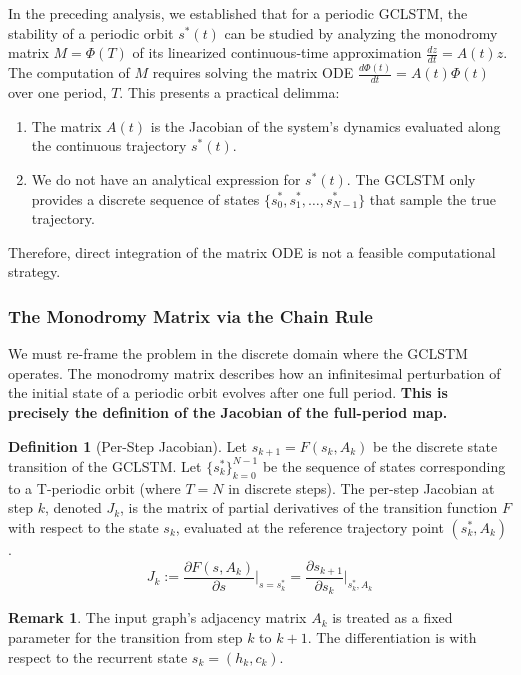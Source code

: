\documentclass{article}
\theoremstyle{remark}
\theoremstyle{definition}
\newtheorem{definition}{Definition}
\newtheorem{remark}[theorem]{Remark}
\newcommand{\dpt}[1]{\frac{d#1}{dt}} %
\begin{document}
In the preceding analysis, we established that for a periodic GCLSTM, the stability of a periodic orbit $s^*(t)$ can be studied by analyzing the monodromy matrix $M = \Phi(T)$ of its linearized continuous-time approximation $\dpt{z} = A(t)z$. The computation of $M$ requires solving the matrix ODE $\dpt{\Phi(t)} = A(t)\Phi(t)$ over one period, $T$. This presents a practical delimma:
\begin{enumerate}
    \item The matrix $A(t)$ is the Jacobian of the system's dynamics evaluated along the continuous trajectory $s^*(t)$.
    \item We do not have an analytical expression for $s^*(t)$. The GCLSTM only provides a discrete sequence of states $\{s^*_0, s^*_1, \dots, s^*_{N-1}\}$ that sample the true trajectory.
\end{enumerate}
Therefore, direct integration of the matrix ODE is not a feasible computational strategy.

\subsubsection{The Monodromy Matrix via the Chain Rule}

We must re-frame the problem in the discrete domain where the GCLSTM operates. The monodromy matrix describes how an infinitesimal perturbation of the initial state of a periodic orbit evolves after one full period. \textbf{This is precisely the definition of the Jacobian of the full-period map.}

\begin{definition}[Per-Step Jacobian]
Let $s_{k+1} = F(s_k, A_k)$ be the discrete state transition of the GCLSTM. Let $\{s^*_k\}_{k=0}^{N-1}$ be the sequence of states corresponding to a T-periodic orbit (where $T=N$ in discrete steps). The per-step Jacobian at step $k$, denoted $J_k$, is the matrix of partial derivatives of the transition function $F$ with respect to the state $s_k$, evaluated at the reference trajectory point $(s^*_k, A_k)$.
\begin{equation}
    J_k := \frac{\partial F(s, A_k)}{\partial s} \bigg|_{s=s^*_k} = \frac{\partial s_{k+1}}{\partial s_k} \bigg|_{s^*_k, A_k}
\end{equation}
\end{definition} \label{def:per_step_jocb}
\begin{remark}
The input graph's adjacency matrix $A_k$ is treated as a fixed parameter for the transition from step $k$ to $k+1$. The differentiation is with respect to the recurrent state $s_k=(h_k, c_k)$.
\end{remark}
\end{document}
